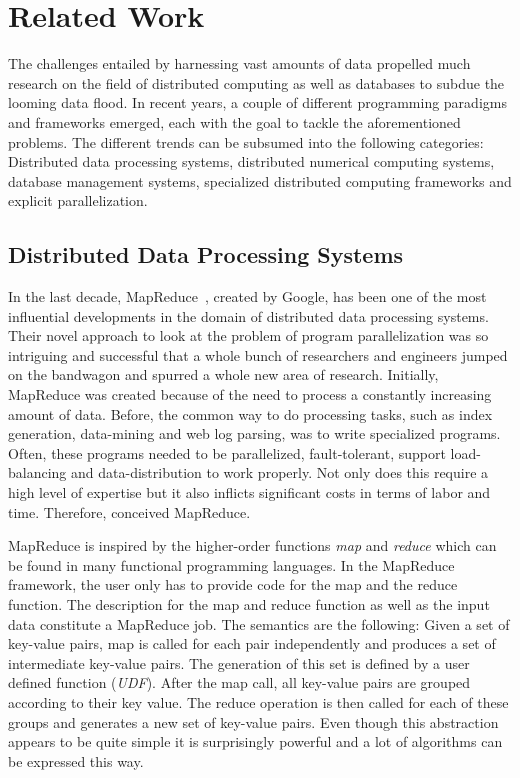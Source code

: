 \chapter{Related Work}
\label{cha:relatedwork}


The challenges entailed by harnessing vast amounts of data propelled much research on the field of distributed computing as well as databases to subdue the looming data flood.
In recent years, a couple of different programming paradigms and frameworks emerged, each with the goal to tackle the aforementioned problems.
The different trends can be subsumed into the following categories: Distributed data processing systems, distributed numerical computing systems, database management systems, specialized distributed computing frameworks and explicit parallelization.

\section{Distributed Data Processing Systems}

In the last decade, MapReduce~\cite{dean:c2008a}, created by Google, has been one of the most influential developments in the domain of distributed data processing systems.
Their novel approach to look at the problem of program parallelization was so intriguing and successful that a whole bunch of researchers and engineers jumped on the bandwagon and spurred a whole new area of research.
Initially, MapReduce was created because of the need to process a constantly increasing amount of data.
Before, the common way to do processing tasks, such as index generation, data-mining and web log parsing, was to write specialized programs.
Often, these programs needed to be parallelized, fault-tolerant, support load-balancing and data-distribution to work properly.
Not only does this require a high level of expertise but it also inflicts significant costs in terms of labor and time.
Therefore, \citeauthor{dean:c2008a} conceived MapReduce.

MapReduce is inspired by the higher-order functions \emph{map} and \emph{reduce} which can be found in many functional programming languages.
In the MapReduce framework, the user only has to provide code for the map and the reduce function.
The description for the map and reduce function as well as the input data constitute a MapReduce job.
The semantics are the following:
Given a set of key-value pairs, map is called for each pair independently and produces a set of intermediate key-value pairs.
The generation of this set is defined by a user defined function (\emph{UDF}).
After the map call, all key-value pairs are grouped according to their key value.
The reduce operation is then called for each of these groups and generates a new set of key-value pairs.
Even though this abstraction appears to be quite simple it is surprisingly powerful and a lot of algorithms can be expressed this way.

